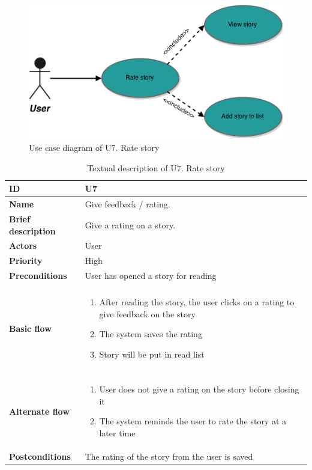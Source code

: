 \begin{figure}[hp]
	\includegraphics[width=\textwidth]{fig/U7}
	\centering
	\caption{Use case diagram of U7. Rate story}
	\label{Fig:U7}
\end{figure}

\begin{table}[hp]
	\renewcommand{\arraystretch}{1.5}
	\centering
	\caption{Textual description of U7. Rate story}
	\begin{tabular}[b]{|l | l|}\hline
		\textbf{ID} 				& U7									\\\hline
		\textbf{Name} 				& Give feedback / rating.				\\\hline
		\textbf{Brief description}	& Give a rating on a story. 			\\\hline
		\textbf{Actors} 			& User									\\\hline
		\textbf{Priority}			& High									\\\hline
		\textbf{Preconditions}		& User has opened a story for reading	\\\hline&\\[-2ex]
		\textbf{Basic flow}			& \begin{minipage}{5in}
			\begin{enumerate}[noitemsep]
				\item After reading the story,  the user clicks on a rating to give feedback on the story
				\item The system saves the rating
				\item Story will be put in read list
			\end{enumerate}						
		\end{minipage}						\\\hline&\\[-2ex]
		\textbf{Alternate flow}		& \begin{minipage}{5in}
			\begin{enumerate}[noitemsep]
				\item User does not give a rating on the story before closing it
				\item The system reminds the user to rate the story at a later time
			\end{enumerate}
		\end{minipage}							\\\hline
		\textbf{Postconditions}		& The rating of the story from the user is saved\\\hline
	\end{tabular}
	\label{Tab:U7}
\end{table}

